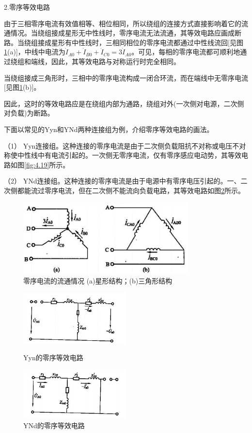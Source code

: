 \documentclass{book}
\begin{document}
2.零序等效电路

由于三相零序电流有效值相等、相位相同，所以绕组的连接方式直接影响着它的流通情况。当绕组接成星形无中性线时，零序电流无法流通，其等效电路应画成断路。当绕组接成星形有中性线时，三相同相位的零序电流都通过中性线流回[见图\ref{fig_4.18}(a)]，中线中电流为${{\dot{I}}_{A0}}+{{\dot{I}}_{B0}}+{{\dot{I}}_{C0}}=3{{\dot{I}}_{A0}}$。可见，每相的零序电流都可顺利地通过绕组和端线，因此，其等效电路与对称运行时完全相同。

当绕组接成三角形时，三相中的零序电流构成一闭合环流，而在端线中无零序电流[见图\ref{fig_4.18}(b)]。

因此，这时的等效电路应是在绕组内部为通路，绕组对外(一次侧对电源，二次侧对负载)为断路。

下面以常见的Yyn和YNd两种连接组为例，介绍零序等效电路的画法。

（1）	Yyn连接组。这种连接的零序电流是由于二次侧负载阻抗不对称或电压不对称使中性线中有电流引起的。一次侧无零序电流，仅有零序感应电动势，其等效电路如图\ref{fig:4.19}所示。

（2）	YNd连接组。这种连接的零序电流是由于电源中有零序电压引起的。一、二次侧都能流过零序电流，但在二次侧不能流向负载电路，其等效电路如图\ref{fig:4.20}所示。

\begin{figure}[H]
	\centering
	\includegraphics[width=0.80\textwidth]{4-18.png}
	\caption{零序电流的流通情况
		(a)星形结构；(b)三角形结构}
	\label{fig_4.18}
\end{figure}
\begin{figure}  
	\begin{minipage}[H]{0.45\linewidth}  
		\centering  
		\includegraphics[width=2.2in]{4-19.png}  
		\caption{Yyn的零序等效电路}  
		\label{fig:4.19}  
	\end{minipage}
	\begin{minipage}[H]{0.45\linewidth}  
		\centering  
		\includegraphics[width=2.2in]{4-20.png}  
		\caption{YNd的零序等效电路}  
		\label{fig:4.20}  
	\end{minipage}  
\end{figure}
\end{document}
